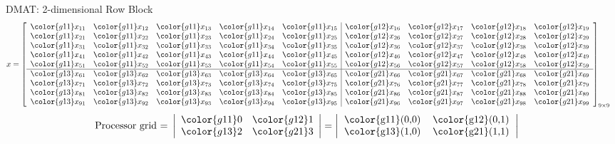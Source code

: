 \begin{frame}
\begin{exampleblock}{DMAT: 2-dimensional Row Block}
\begin{align*}
x &= \left[
      \begin{array}{lllll|llll}
      \color{g11}x_{11} & \color{g11}x_{12} & \color{g11}x_{13} & 
\color{g11}x_{14} & \color{g11}x_{15} & \color{g12}x_{16} & \color{g12}x_{17} & 
\color{g12}x_{18} & \color{g12}x_{19}\\
      \color{g11}x_{21} & \color{g11}x_{22} & \color{g11}x_{23} & 
\color{g11}x_{24} & \color{g11}x_{25} & \color{g12}x_{26} & \color{g12}x_{27} & 
\color{g12}x_{28} & \color{g12}x_{29}\\
      \color{g11}x_{31} & \color{g11}x_{32} & \color{g11}x_{33} & 
\color{g11}x_{34} & \color{g11}x_{35} & \color{g12}x_{36} & \color{g12}x_{37} & 
\color{g12}x_{38} & \color{g12}x_{39}\\
      \color{g11}x_{41} & \color{g11}x_{42} & \color{g11}x_{43} & 
\color{g11}x_{44} & \color{g11}x_{45} & \color{g12}x_{46} & \color{g12}x_{47} & 
\color{g12}x_{48} & \color{g12}x_{49}\\
      \color{g11}x_{51} & \color{g11}x_{52} & \color{g11}x_{53} & 
\color{g11}x_{54} & \color{g11}x_{55} & \color{g12}x_{56} & \color{g12}x_{57} & 
\color{g12}x_{58} & \color{g12}x_{59}\\\hline
      \color{g13}x_{61} & \color{g13}x_{62} & \color{g13}x_{63} & 
\color{g13}x_{64} & \color{g13}x_{65} & \color{g21}x_{66} & \color{g21}x_{67} & 
\color{g21}x_{68} & \color{g21}x_{69}\\
      \color{g13}x_{71} & \color{g13}x_{72} & \color{g13}x_{73} & 
\color{g13}x_{74} & \color{g13}x_{75} & \color{g21}x_{76} & \color{g21}x_{77} & 
\color{g21}x_{78} & \color{g21}x_{79}\\
      \color{g13}x_{81} & \color{g13}x_{82} & \color{g13}x_{83} & 
\color{g13}x_{84} & \color{g13}x_{85} & \color{g21}x_{86} & \color{g21}x_{87} & 
\color{g21}x_{88} & \color{g21}x_{89}\\
      \color{g13}x_{91} & \color{g13}x_{92} & \color{g13}x_{93} & 
\color{g13}x_{94} & \color{g13}x_{95} & \color{g21}x_{96} & \color{g21}x_{97} & 
\color{g21}x_{98} & \color{g21}x_{99}\\
      \end{array}
\right]_{9\times 9}
\end{align*}
\begin{align*}
\text{Processor grid = }\left|
      \begin{array}{ll}
      \color{g11}0 & \color{g12}1 \\
      \color{g13}2 & \color{g21}3
      \end{array}
\right| &= 
\left|
      \begin{tabular}{lll}
      \color{g11}(0,0) & \color{g12}(0,1) \\
      \color{g13}(1,0) & \color{g21}(1,1) 
      \end{tabular}
\right|
\end{align*}
\end{exampleblock}
\end{frame}



